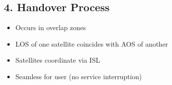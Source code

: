 \documentclass[11pt,letterpaper]{article}
\begin{document}
\subsection*{4. Handover Process}
\begin{itemize}
    \item Occurs in overlap zones
    \item LOS of one satellite coincides with AOS of another
    \item Satellites coordinate via ISL
    \item Seamless for user (no service interruption)
\end{itemize}
\end{document}
